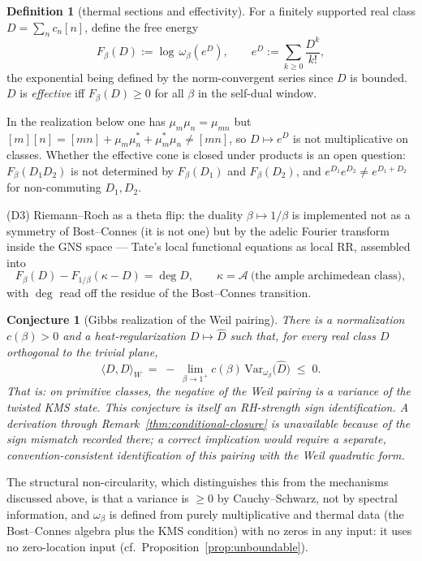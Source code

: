 \documentclass[11pt]{amsart}
\newtheorem{conjecture}[theorem]{Conjecture}
\theoremstyle{definition}
\newtheorem{definition}[theorem]{Definition}
\theoremstyle{remark}
\theoremstyle{definition}
\begin{document}
\begin{definition}[thermal sections and effectivity]\label{def:thermal-effectivity}
For a finitely supported real class $D=\sum_n c_n[n]$, define the free energy
\[
   F_\beta(D):=\log\,\omega_\beta\!\left(e^{D}\right),
   \qquad e^{D}:=\sum_{k\ge0}\frac{D^k}{k!},
\]
the exponential being defined by the norm-convergent series since $D$ is bounded.
$D$ is \emph{effective} iff $F_\beta(D)\ge0$ for all $\beta$ in the self-dual window.
\end{definition}
\noindent In the realization below one has $\mu_m\mu_n=\mu_{mn}$ but $[m][n]=[mn]+\mu_m\mu_n^*+\mu_m^*\mu_n\neq[mn]$,
so $D\mapsto e^D$ is not multiplicative on classes.  Whether the effective cone is closed under
products is an open question: $F_\beta(D_1D_2)$ is not determined by $F_\beta(D_1)$ and $F_\beta(D_2)$, and
$e^{D_1}e^{D_2}\neq e^{D_1+D_2}$ for non-commuting $D_1,D_2$.

\textnormal{(D3)} Riemann--Roch as a theta flip: the duality $\beta\mapsto1/\beta$ is implemented not as a
symmetry of Bost--Connes (it is not one) but by the adelic Fourier transform inside the GNS space ---
Tate's local functional equations as local RR, assembled into
\[
   F_\beta(D)-F_{1/\beta}(\kappa-D)=\deg D,\qquad \kappa=\mathcal A\ \text{(the ample archimedean class)},
\]
with $\deg$ read off the residue of the Bost--Connes transition.

\begin{conjecture}[Gibbs realization of the Weil pairing]\label{conj:X3G}
There is a normalization $c(\beta)>0$ and a heat-regularization $D\mapsto\widehat D$ such that, for every
real class $D$ orthogonal to the trivial plane,
\[
   \langle D,D\rangle_W \;=\; -\,\lim_{\beta\to1^+} c(\beta)\,\mathrm{Var}_{\omega_\beta}\!\big(\widehat
   D\big)\;\le\;0 .
\]
That is: on primitive classes, the negative of the Weil pairing \emph{is a variance} of the twisted KMS
state.  This conjecture is itself an RH-strength sign identification.  A derivation through
Remark~\ref{thm:conditional-closure} is unavailable because of the sign mismatch recorded there; a
correct implication would require a separate, convention-consistent identification of this pairing
with the Weil quadratic form.
\end{conjecture}

The structural non-circularity, which distinguishes this from the mechanisms discussed above, is that a variance
is $\ge0$ by Cauchy--Schwarz, not by spectral information, and $\omega_\beta$ is defined from purely
multiplicative and thermal data (the Bost--Connes algebra plus the KMS condition) with no zeros in any
input: it uses no zero-location input (cf.\ Proposition~\ref{prop:unboundable}).
\end{document}
